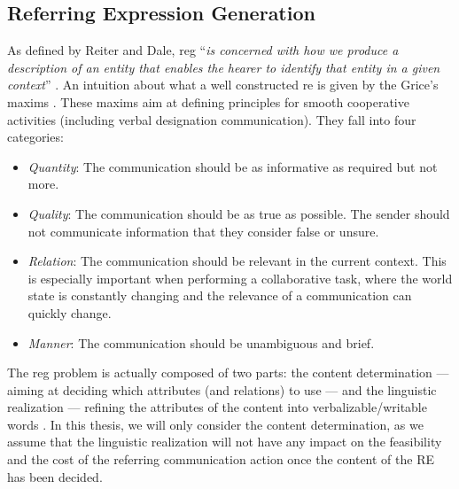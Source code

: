 \documentclass[a4paper,11pt,twoside]{StyleThese}
\begin{document}
\subsection{Referring Expression Generation}
As defined by Reiter and Dale, \acrfull{reg} ``\textit{is concerned with how we produce a description of an entity that enables the hearer to identify that entity in a given context}'' \cite{reiter1997building}. An intuition about what a well constructed \acrfull{re} is given by the Grice's maxims \cite{grice1975logic}. These maxims aim at defining principles for smooth cooperative activities (including verbal designation communication). They fall into four categories:
\begin{itemize}
\item \textit{Quantity}: The communication should be as informative as required but not more.
\item \textit{Quality}: The communication should be as true as possible. The sender should not communicate information that they consider false or unsure.
\item \textit{Relation}: The communication should be relevant in the current context. This is especially important when performing a collaborative task, where the world state is constantly changing and the relevance of a communication can quickly change.
\item \textit{Manner}: The communication should be unambiguous and brief.
\end{itemize}

The \acrshort{reg} problem is actually composed of two parts: the content determination --- aiming at deciding which attributes (and relations) to use --- and the linguistic realization --- refining the attributes of the content into verbalizable/writable words \cite{krahmer2012computational}. In this thesis, we will only consider the content determination, as we assume that the linguistic realization will not have any impact on the feasibility and the cost of the referring communication action once the content of the RE has been decided.
\end{document}

